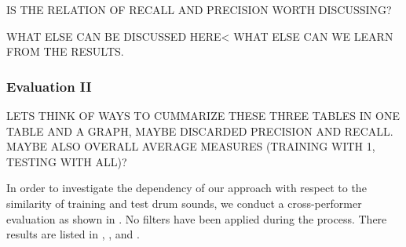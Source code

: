 \documentclass{article}
\begin{document}
IS THE RELATION OF RECALL AND PRECISION WORTH DISCUSSING?

WHAT ELSE CAN BE DISCUSSED HERE< WHAT ELSE CAN WE LEARN FROM THE RESULTS.


\subsubsection{Evaluation II}
LETS THINK OF WAYS TO CUMMARIZE THESE THREE TABLES IN ONE TABLE AND A GRAPH, MAYBE DISCARDED PRECISION AND RECALL. MAYBE ALSO OVERALL AVERAGE MEASURES (TRAINING WITH 1, TESTING WITH ALL)?

In order to investigate the dependency of our approach with respect to the similarity of training and test drum sounds, we conduct a cross-performer evaluation as shown in . No filters have been applied during the process. There results are listed in , , and .
\end{document}
